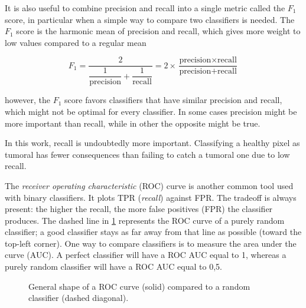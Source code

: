 It is also useful to combine precision and recall into a single metric called the $F_1$ score, in particular when a simple way to compare two classifiers is needed. The $F_1$ score is the harmonic mean of precision and recall, which gives more weight to low values compared to a regular mean

\begin{equation}
    F_1 = \frac{2}{\dfrac{1}{\text{precision}} + \dfrac{1}{\text{recall}}} = 2 \times \frac{\text{precision} \times \text{recall}}{\text{precision} + \text{recall}}
\end{equation}

however, the $F_1$ score favors classifiers that have similar precision and recall, which might not be optimal for every classifier. In some cases precision might be more important than recall, while in other the opposite might be true.

In this work, recall is undoubtedly more important. Classifying a healthy pixel as tumoral has fewer consequences than failing to catch a tumoral one due to low recall.

The \textit{receiver operating characteristic} (ROC) curve is another common tool used with binary classifiers. It plots TPR (\textit{recall}) against FPR. The tradeoff is always present: the higher the recall, the more false positives (FPR) the classifier produces. The dashed line in \cref{fig:roc_curve} represents the ROC curve of a purely random classifier; a good classifier stays as far away from that line as possible (toward the top-left corner). One way to compare classifiers is to measure the area under the curve (AUC). A perfect classifier will have a ROC AUC equal to 1, whereas a purely random classifier will have a ROC AUC equal to 0,5.

\begin{figure}[H]
    \centering
    \caption{General shape of a ROC curve (solid) compared to a random classifier (dashed diagonal).}
    \label{fig:roc_curve}
\end{figure}


